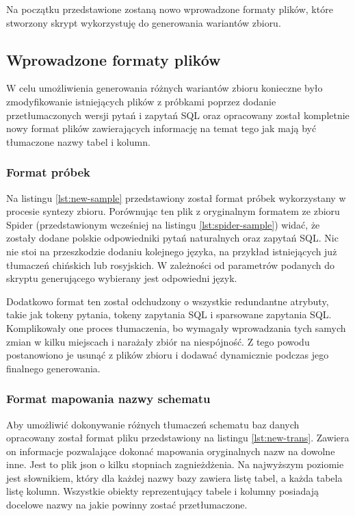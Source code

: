 Na początku przedstawione zostaną nowo wprowadzone formaty plików, które stworzony skrypt wykorzystuję do generowania wariantów zbioru.

\subsection{Wprowadzone formaty plików}
W celu umożliwienia generowania różnych wariantów zbioru konieczne było zmodyfikowanie istniejących plików z próbkami poprzez dodanie przetłumaczonych wersji pytań i zapytań SQL oraz opracowany został kompletnie nowy format plików zawierających informację na temat tego jak mają być tłumaczone nazwy tabel i kolumn.

\subsubsection{Format próbek}
Na listingu \ref{lst:new-sample} przedstawiony został format próbek wykorzystany w procesie syntezy zbioru. Porównując ten plik z oryginalnym formatem ze zbioru Spider (przedstawionym wcześniej na listingu \ref{lst:spider-sample}) widać, że zostały dodane polskie odpowiedniki pytań naturalnych oraz zapytań SQL. Nic nie stoi na przeszkodzie dodaniu kolejnego języka, na przykład istniejących już tłumaczeń chińskich lub rosyjskich. W zależności od parametrów podanych do skryptu generującego wybierany jest odpowiedni język. 

\begin{minipage}{\linewidth}

\end{minipage}

Dodatkowo format ten został odchudzony o wszystkie redundantne atrybuty, takie jak tokeny pytania, tokeny zapytania SQL i sparsowane zapytania SQL. Komplikowały one proces tłumaczenia, bo wymagały wprowadzania tych samych zmian w kilku miejscach i narażały zbiór na niespójność. Z tego powodu postanowiono je usunąć z plików zbioru i dodawać dynamicznie podczas jego finalnego generowania.

\subsubsection{Format mapowania nazwy schematu}
Aby umożliwić dokonywanie różnych tłumaczeń schematu baz danych opracowany został format pliku przedstawiony na listingu \ref{lst:new-trans}. Zawiera on informacje pozwalające dokonać mapowania oryginalnych nazw na dowolne inne. Jest to plik json o kilku stopniach zagnieżdżenia. Na najwyższym poziomie jest słownikiem, który dla każdej nazwy bazy zawiera listę tabel, a każda tabela listę kolumn. Wszystkie obiekty reprezentujący tabele i kolumny posiadają docelowe nazwy na jakie powinny zostać przetłumaczone.

